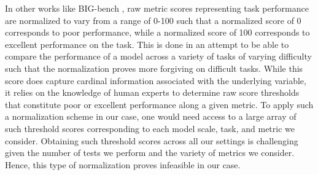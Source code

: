 In other works like BIG-bench \cite{bigbench}, raw metric scores representing task performance are normalized to vary from a range of 0-100 such that a normalized score of 0 corresponds to poor performance, while a normalized score of 100 corresponds to excellent performance on the task. This is done in an attempt to be able to compare the performance of a model across a variety of tasks of varying difficulty such that the normalization proves more forgiving on difficult tasks. While this score does capture cardinal information associated with the underlying variable, it relies on the knowledge of human experts to determine raw score thresholds that constitute poor or excellent performance along a given metric. To apply such a normalization scheme in our case, one would need access to a large array of such threshold scores corresponding to each model scale, task, and metric we consider. Obtaining such threshold scores across all our settings is challenging given the number of tests we perform and the variety of metrics we consider. Hence, this type of normalization proves infeasible in our case.


\iffalse
\section{Full results}

We present our entire array of unaggregated results in Table \ref{table:all_results}.

\fi